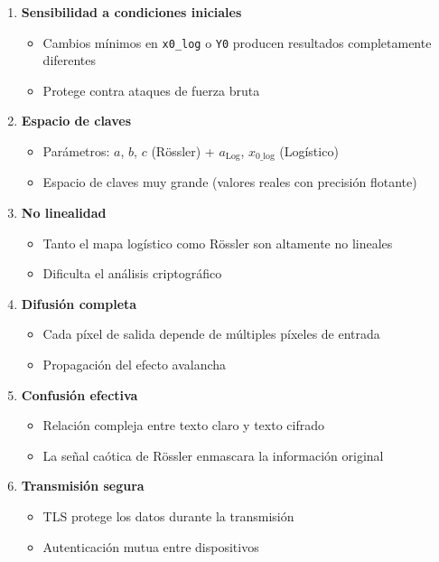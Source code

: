 \documentclass[12pt,a4paper]{article}
\begin{document}
\begin{enumerate}
    \item \textbf{Sensibilidad a condiciones iniciales}
    \begin{itemize}
        \item Cambios mínimos en \texttt{x0\_log} o \texttt{Y0} producen resultados completamente diferentes
        \item Protege contra ataques de fuerza bruta
    \end{itemize}
    
    \item \textbf{Espacio de claves}
    \begin{itemize}
        \item Parámetros: $a$, $b$, $c$ (Rössler) + $a_{\text{Log}}$, $x_{0\text{\_log}}$ (Logístico)
        \item Espacio de claves muy grande (valores reales con precisión flotante)
    \end{itemize}
    
    \item \textbf{No linealidad}
    \begin{itemize}
        \item Tanto el mapa logístico como Rössler son altamente no lineales
        \item Dificulta el análisis criptográfico
    \end{itemize}
    
    \item \textbf{Difusión completa}
    \begin{itemize}
        \item Cada píxel de salida depende de múltiples píxeles de entrada
        \item Propagación del efecto avalancha
    \end{itemize}
    
    \item \textbf{Confusión efectiva}
    \begin{itemize}
        \item Relación compleja entre texto claro y texto cifrado
        \item La señal caótica de Rössler enmascara la información original
    \end{itemize}
    
    \item \textbf{Transmisión segura}
    \begin{itemize}
        \item TLS protege los datos durante la transmisión
        \item Autenticación mutua entre dispositivos
    \end{itemize}
\end{enumerate}
\end{document}
